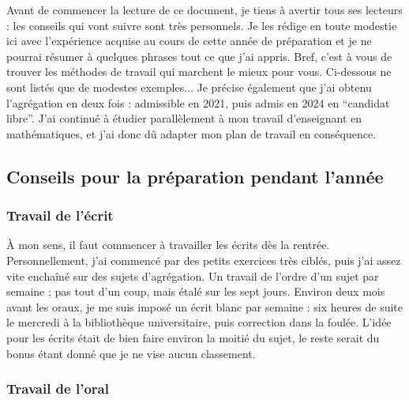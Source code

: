 





  Avant de commencer la lecture de ce document, je tiens à avertir tous ses lecteurs : les conseils qui vont suivre sont très personnels. Je les rédige en toute modestie ici avec l'expérience acquise au cours de cette année de préparation et je ne pourrai résumer à quelques phrases tout ce que j'ai appris. Bref, c'est à vous de trouver les méthodes de travail qui marchent le mieux pour vous. Ci-dessous ne sont listés que de modestes exemples...
  \newpar
  Je précise également que j'ai obtenu l'agrégation en deux fois : admissible en 2021, puis admis en 2024 en ``candidat libre''. J'ai continué à étudier parallèlement à mon travail d'enseignant en mathématiques, et j'ai donc dû adapter mon plan de travail en conséquence.

  \subsection{Conseils pour la préparation pendant l'année}

  \subsubsection{Travail de l'écrit}

  À mon sens, il faut commencer à travailler les écrits dès la rentrée. Personnellement, j'ai commencé par des petits exercices très ciblés, puis j'ai assez vite enchaîné sur des sujets d'agrégation. Un travail de l'ordre d'un sujet par semaine ; pas tout d'un coup, mais étalé sur les sept jours. Environ deux mois avant les oraux, je me suis imposé un écrit blanc par semaine : six heures de suite le mercredi à la bibliothèque universitaire, puis correction dans la foulée.
  \newpar
  L'idée pour les écrits était de bien faire environ la moitié du sujet, le reste serait du bonus étant donné que je ne vise aucun classement.

  \subsubsection{Travail de l'oral}

